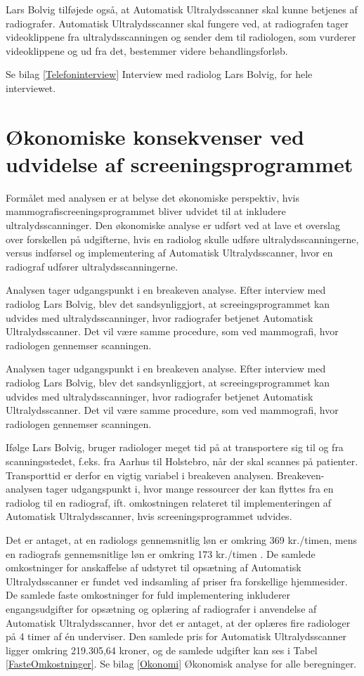 Lars Bolvig tilføjede også, at Automatisk Ultralydsscanner skal kunne betjenes af radiografer. Automatisk Ultralydsscanner skal fungere ved, at radiografen tager videoklippene fra ultralydsscanningen og sender dem til radiologen, som vurderer videoklippene og ud fra det, bestemmer videre behandlingsforløb.

Se bilag \ref{Telefoninterview} Interview med radiolog Lars Bolvig, for hele interviewet. 

\section{Økonomiske konsekvenser ved udvidelse af screeningsprogrammet} 
Formålet med analysen er at belyse det økonomiske perspektiv, hvis mammografiscreeningsprogrammet bliver udvidet til at inkludere ultralydsscanninger. Den økonomiske analyse er udført ved at lave et overslag over forskellen på udgifterne, hvis en radiolog skulle udføre ultralydsscanningerne, versus indførsel og implementering af Automatisk Ultralydsscanner, hvor en radiograf udfører ultralydsscanningerne. 

Analysen tager udgangspunkt i en breakeven analyse.  Efter interview med radiolog Lars Bolvig, blev det sandsynliggjort, at screeingsprogrammet kan udvides med ultralydsscanninger, hvor radiografer betjenet Automatisk Ultralydsscanner. Det vil være samme procedure, som ved mammografi, hvor radiologen gennemser scanningen. 

Analysen tager udgangspunkt i en breakeven analyse.  Efter interview med radiolog Lars Bolvig, blev det sandsynliggjort, at screeingsprogrammet kan udvides med ultralydsscanninger, hvor radiografer betjenet Automatisk Ultralydsscanner. Det vil være samme procedure, som ved mammografi, hvor radiologen gennemser scanningen. 

Ifølge Lars Bolvig, bruger radiologer meget tid på at transportere sig til og fra scanningsstedet, f.eks. fra Aarhus til Holstebro, når der skal scannes på patienter.  Transporttid er derfor en vigtig variabel i breakeven analysen. Breakeven-analysen tager udgangspunkt i, hvor mange ressourcer der kan flyttes fra en radiolog til en radiograf, ift. omkostningen relateret til implementeringen af Automatisk Ultralydsscanner, hvis screeningsprogrammet udvides.  

Det er antaget, at en radiologs gennemsnitlig løn er omkring 369 kr./timen, mens en radiografs gennemsnitlige løn er omkring 173 kr./timen \cite{Lon}. De samlede omkostninger for anskaffelse af udstyret til opsætning af Automatisk Ultralydsscanner er fundet ved indsamling af priser fra forskellige hjemmesider. De samlede faste omkostninger for fuld implementering inkluderer engangsudgifter for opsætning og oplæring af radiografer i anvendelse af Automatisk Ultralydsscanner, hvor det er antaget, at der oplæres fire radiologer på 4 timer af én underviser.  Den samlede pris for Automatisk Ultralydsscanner ligger omkring 219.305,64 kroner, og de samlede udgifter kan ses i Tabel \ref{FasteOmkostninger}.  Se bilag \ref{Okonomi} Økonomisk analyse for alle beregninger. 

